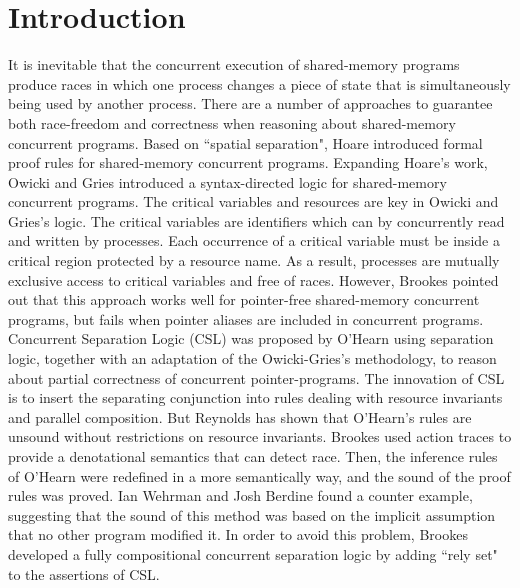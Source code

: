 \documentclass{lmcs} %
\theoremstyle{plain}\newtheorem{satz}[thm]{Satz} %
\begin{document}
\section*{Introduction}\label{S:one}
It is inevitable that the concurrent execution of shared-memory  programs produce races in which one process changes a piece of state that is simultaneously being used by another process. There are a number of approaches to guarantee both race-freedom and correctness when reasoning about shared-memory concurrent programs. Based on ``spatial separation", Hoare\cite{hoare1972towards} introduced formal proof rules for shared-memory concurrent programs. Expanding Hoare's work, Owicki and Gries\cite{owicki1976axiomatic}\cite{owicki1976verifying} introduced a syntax-directed logic for shared-memory concurrent programs. The critical variables and resources are key in Owicki and Gries's logic. The critical variables are identifiers which can by concurrently read and written by processes. Each occurrence of a critical variable must be inside a critical region protected by a resource name. As a result, processes are mutually exclusive access to critical variables and free of races. However, Brookes\cite{brookes2007semantics} pointed out that this approach works well for pointer-free shared-memory concurrent programs, but fails when pointer aliases are included in concurrent programs. Concurrent Separation Logic (CSL) was proposed by O'Hearn\cite{o2007resources} using separation logic\cite{reynolds2002separation}, together with an adaptation of the Owicki-Gries's methodology, to reason about partial correctness of concurrent pointer-programs. The innovation of CSL is to insert the separating conjunction into rules dealing with resource invariants and parallel composition. But Reynolds has shown that O'Hearn's rules are unsound without restrictions on resource invariants\cite{o2009separation}. Brookes\cite{brookes2007semantics} used action traces to provide a denotational semantics that can detect race. Then, the inference rules of O'Hearn were redefined in a more semantically way, and the sound of the proof rules was proved. Ian Wehrman and Josh Berdine found a counter example, suggesting that the sound of this method was based on the implicit assumption that no other program modified it. In order to avoid this problem, Brookes developed a fully compositional concurrent separation logic by adding ``rely set" to the assertions of CSL\cite{brookes2011revisionist}.\\
\end{document}
